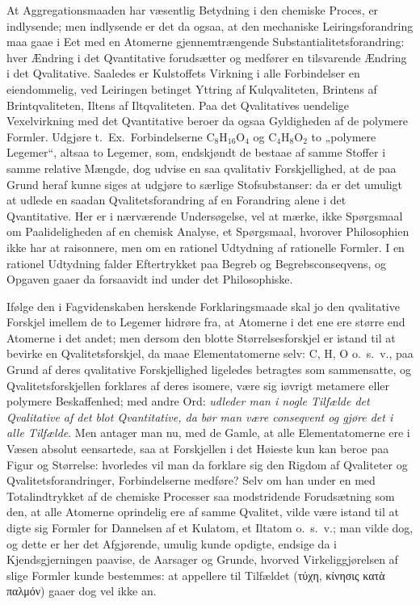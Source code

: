 \documentclass[12pt,a4paper]{book}
\begin{document}
At Aggregationsmaaden har væsentlig Betydning i den
chemiske Proces, er indlysende; men indlysende er det da
ogsaa, at den mechaniske Leiringsforandring maa gaae i
Eet med en Atomerne gjennemtrængende
Substantialitetsforandring: hver Ændring i det Qvantitative forudsætter og
medfører en tilsvarende Ændring i det Qvalitative.
Saaledes er Kulstoffets Virkning i alle Forbindelser en
eiendommelig, ved Leiringen betinget Yttring af Kulqvaliteten,
Brintens af Brintqvaliteten, Iltens af Iltqvaliteten. Paa
det Qvalitatives uendelige Vexelvirkning med det Qvantitative
beroer da ogsaa Gyldigheden af de polymere Formler.
Udgjøre t.~Ex.\ Forbindelserne
$\mathrm{C}_8\mathrm{H}_{16}\mathrm{O}_4$ og
$\mathrm{C}_4\mathrm{H}_8\mathrm{O}_2$ to „polymere
Legemer“, altsaa to Legemer, som, endskjøndt de bestaae af
samme Stoffer i samme relative Mængde, dog udvise en saa
qvalitativ Forskjellighed, at de paa Grund heraf kunne siges
at udgjøre to særlige Stofsubstanser: da er det umuligt at
udlede en saadan Qvalitetsforandring af en Forandring alene
i det Qvantitative. Her er i nærværende Undersøgelse, vel
at mærke, ikke Spørgsmaal om Paalideligheden af en
chemisk Analyse, et Spørgsmaal, hvorover Philosophien ikke har
at raisonnere, men om en rationel Udtydning af rationelle
Formler. I en rationel Udtydning falder Eftertrykket paa
Begreb og Begrebsconseqvens, og Opgaven gaaer da
forsaavidt ind under det Philosophiske.

Ifølge den i Fagvidenskaben herskende Forklaringsmaade
skal jo den qvalitative Forskjel imellem de to Legemer hidrøre
fra, at Atomerne i det ene ere større end Atomerne i det andet;
men dersom den blotte Størrelsesforskjel er istand til at bevirke
en Qvalitetsforskjel, da maae Elementatomerne selv:
$\mathrm{C}$, $\mathrm{H}$, $\mathrm{O}$
o.~s.~v., paa Grund af deres qvalitative Forskjellighed
ligeledes betragtes som sammensatte, og Qvalitetsforskjellen
forklares af deres isomere, være sig iøvrigt metamere eller
polymere Beskaffenhed; med andre Ord: \emph{udleder man i nogle
Tilfælde det Qvalitative af det blot Qvantitative,
da bør man være conseqvent og gjøre det i
alle Tilfælde}. Men antager man nu, med de Gamle, at
alle Elementatomerne ere i Væsen absolut eensartede, saa at
Forskjellen i det Høieste kun kan beroe paa Figur og
Størrelse: hvorledes vil man da forklare sig den Rigdom af
Qvaliteter og Qvalitetsforandringer, Forbindelserne medføre?
Selv om han under en med Totalindtrykket af de chemiske
Processer saa modstridende Forudsætning som den, at alle
Atomerne oprindelig ere af samme Qvalitet, vilde være istand
til at digte sig Formler for Dannelsen af et Kulatom, et
Iltatom o.~s.~v.; man vilde dog, og dette er her det
Afgjørende, umulig kunde opdigte, endsige da i Kjendsgjerningen
paavise, de Aarsager og Grunde, hvorved Virkeliggjørelsen af
slige Formler kunde bestemmes: at appellere til Tilfældet
(τύχη, κίνησις κατὰ παλμόν) gaaer dog vel ikke an.
\end{document}
